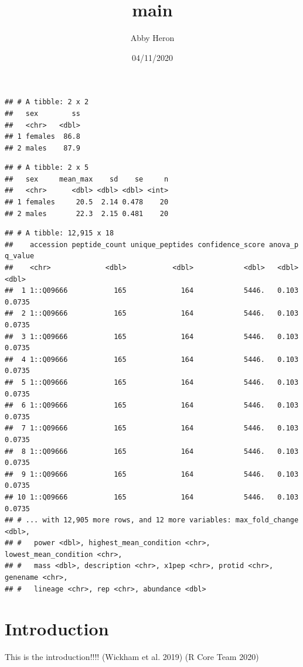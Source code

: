 \documentclass[
]{article}
\title{main}
\author{Abby Heron}
\date{04/11/2020}
\begin{document}
\maketitle

{
\setcounter{tocdepth}{2}
\tableofcontents
}
\begin{verbatim}
## # A tibble: 2 x 2
##   sex        ss
##   <chr>   <dbl>
## 1 females  86.8
## 2 males    87.9
\end{verbatim}

\begin{verbatim}
## # A tibble: 2 x 5
##   sex     mean_max    sd    se     n
##   <chr>      <dbl> <dbl> <dbl> <int>
## 1 females     20.5  2.14 0.478    20
## 2 males       22.3  2.15 0.481    20
\end{verbatim}

\begin{verbatim}
## # A tibble: 12,915 x 18
##    accession peptide_count unique_peptides confidence_score anova_p q_value
##    <chr>             <dbl>           <dbl>            <dbl>   <dbl>   <dbl>
##  1 1::Q09666           165             164            5446.   0.103  0.0735
##  2 1::Q09666           165             164            5446.   0.103  0.0735
##  3 1::Q09666           165             164            5446.   0.103  0.0735
##  4 1::Q09666           165             164            5446.   0.103  0.0735
##  5 1::Q09666           165             164            5446.   0.103  0.0735
##  6 1::Q09666           165             164            5446.   0.103  0.0735
##  7 1::Q09666           165             164            5446.   0.103  0.0735
##  8 1::Q09666           165             164            5446.   0.103  0.0735
##  9 1::Q09666           165             164            5446.   0.103  0.0735
## 10 1::Q09666           165             164            5446.   0.103  0.0735
## # ... with 12,905 more rows, and 12 more variables: max_fold_change <dbl>,
## #   power <dbl>, highest_mean_condition <chr>, lowest_mean_condition <chr>,
## #   mass <dbl>, description <chr>, x1pep <chr>, protid <chr>, genename <chr>,
## #   lineage <chr>, rep <chr>, abundance <dbl>
\end{verbatim}

\hypertarget{introduction}{%
\section{Introduction}\label{introduction}}

This is the introduction!!!! (Wickham et al. 2019) (R Core Team 2020)
\end{document}

